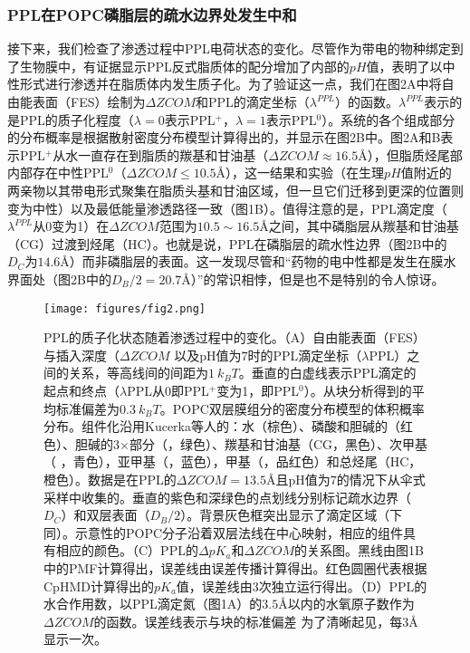 \documentclass[journal=,manuscript=artical,email=false]{achemso}
\begin{document}
\subsubsection{PPL在POPC磷脂层的疏水边界处发生中和}
接下来，我们检查了渗透过程中PPL电荷状态的变化。尽管作为带电的物种绑定到了生物膜中，有证据显示PPL反式脂质体的配分增加了内部的$pH$值，表明了以中性形式进行渗透并在脂质体内发生质子化。为了验证这一点，我们在图2A中将自由能表面（FES）绘制为$\Delta ZCOM$和PPL的滴定坐​​标（$\lambda ^{PPL}$）的函数。$\lambda ^{PPL}$表示的是PPL的质子化程度（$\lambda=0$表示PPL$^{+}$，$\lambda=1$表示PPL$^{0}$）。系统的各个组成部分的分布概率是根据散射密度分布模型计算得出的，并显示在图2B中。图2A和B表示PPL$^{+}$从水一直存在到脂质的羰基和甘油基（$\Delta ZCOM\approx 16.5$\AA ），但脂质烃尾部内部存在中性PPL$^0$（$\Delta ZCOM \le 10.5$\AA ），这一结果和实验（在生理$pH$值附近的两亲物以其带电形式聚集在脂质头基和甘油区域，但一旦它们迁移到更深的位置则变为中性）以及最低能量渗透路径一致（图1B）。值得注意的是，PPL滴定度（$\lambda ^{PPL}$从0变为1）在$\Delta ZCOM$范围为$10.5\sim 16.5$\AA 之间，其中磷脂层从羰基和甘油基（CG）过渡到烃尾（HC）。也就是说，PPL在磷脂层的疏水性边界（图2B中的$D_C$为$14.6$\AA ）而非磷脂层的表面。这一发现尽管和“药物的电中性都是发生在膜水界面处（图2B中的$D_B/2=20.7$\AA ）”的常识相悖，但是也不是特别的令人惊讶。

\begin{figure}[h]
\centering
\texttt{[image: figures/fig2.png]}
\caption{PPL的质子化状态随着渗透过程中的变化。（A）自由能表面（FES）与插入深度（$\Delta ZCOM$ 以及pH值为$7$时的PPL滴定坐标（$\lambda$PPL）之间的关系，等高线间的间距为$1~k_BT$。垂直的白虚线表示PPL滴定的起点和终点（$\lambda$PPL从0即PPL$^{+}$变为1，即PPL$​^{​0}$）。从块分析得到的平均标准偏差为$0.3~k_BT$。POPC双层膜组分的密度分布模型的体积概率分布。组件化沿用Kucerka等人的：水（棕色）、磷酸和胆碱的（红色）、胆碱的3$\times$部分（，绿色）、羰基和甘油基（CG，黑色）、次甲基（ ，青色），亚甲基（，蓝色），甲基（，品红色）和总烃尾（HC，橙色）。数据是在PPL的$\Delta ZCOM= 13.5$\AA 且pH值为$7$的情况下从伞式采样中收集的。垂直的紫色和深绿色的点划线分别标记疏水边界（$D_C$）和双层表面（$D_B / 2$）。背景灰色框突出显示了滴定区域（下同）。示意性的POPC分子沿着双层法线在中心映射，相应的组件具有相应的颜色。（C）PPL的$\Delta pK_a$和$\Delta ZCOM$的关系图。黑线由图1B中的PMF计算得出，误差线由误差传播计算得出。红色圆圈代表根据CpHMD计算得出的$pK_a$值，误差线由$3$次独立运行得出。（D）PPL的水合作用数，以PPL滴定氮（图1A）的$3.5$\AA 以内的水氧原子数作为$\Delta ZCOM$的函数。误差线表示与块的标准偏差
为了清晰起见，每$3$\AA 显示一次。}
\label{fig:fig2}
\end{figure}
\end{document}
